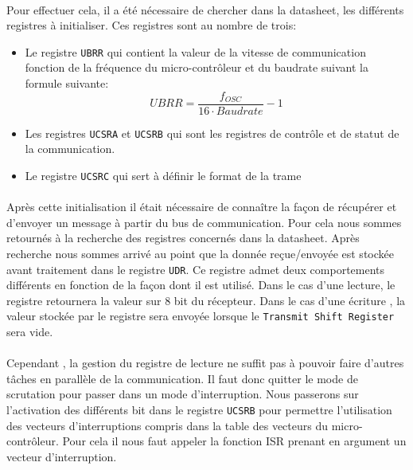 \paragraph{}
Pour effectuer cela, il a été nécessaire de chercher dans la datasheet, les
différents registres à initialiser. Ces registres sont au nombre de trois:
\begin{itemize}
  \item Le registre \verb!UBRR! qui contient la valeur de la vitesse de communication
    fonction de la fréquence du micro-contrôleur et du baudrate suivant la
    formule suivante:\begin{equation}
      UBRR = \frac{f_{OSC}}{16 \cdot Baudrate} -1
      \label{baudrate}
    \end{equation}
  \item Les registres \verb!UCSRA! et \verb!UCSRB! qui sont les registres de contrôle et de
    statut de la communication.
  \item Le registre \verb!UCSRC! qui sert à définir le format de la trame
\end{itemize}

\paragraph{}
Après cette initialisation il était nécessaire de connaître la façon de
récupérer et d'envoyer un message à partir du bus de communication. Pour cela
nous sommes retournés à la recherche des registres concernés dans la datasheet.
Après recherche nous sommes arrivé au point que la donnée reçue/envoyée est
stockée avant traitement dans le registre \verb!UDR!. Ce registre admet deux
comportements différents en fonction de la façon dont il est utilisé. Dans le
cas d'une lecture, le registre retournera la valeur sur 8 bit du récepteur. Dans
le cas d'une écriture , la valeur stockée par le registre sera envoyée lorsque
le \verb!Transmit Shift Register! sera vide.

\paragraph{}
Cependant , la gestion du registre de lecture ne suffit pas à pouvoir faire
d'autres tâches en parallèle de la communication. Il faut donc quitter le mode
de scrutation pour passer dans un mode d'interruption. Nous passerons sur
l'activation des différents bit dans le registre \verb!UCSRB! pour permettre
l'utilisation des vecteurs d'interruptions compris dans la table des vecteurs du
micro-contrôleur. Pour cela il nous faut appeler la fonction ISR prenant en
argument un vecteur d'interruption. 

